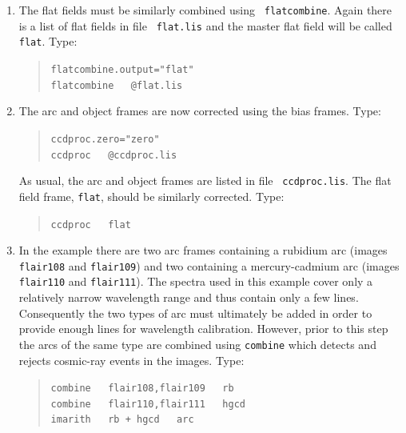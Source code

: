 \documentclass[twoside,11pt]{article}
\begin{document}
\begin{enumerate}
  \begin{quote}
   {\tt zerocombine.output="zero"  \\
   zerocombine ~ @zero.lis}
  \end{quote}

  \item The flat fields must be similarly combined using {\tt
   flatcombine}.  Again there is a list of flat fields in file {\tt
   flat.lis} and the master flat field will be called {\tt flat}.
   Type:

  \begin{quote}
   {\tt flatcombine.output="flat"  \\
   flatcombine ~ @flat.lis}
  \end{quote}

  \item The arc and object frames are now corrected using the bias
   frames.  Type:

  \begin{quote}
   {\tt ccdproc.zero="zero"  \\
   ccdproc ~ @ccdproc.lis}
  \end{quote}

   As usual, the arc and object frames are listed in file {\tt
   ccdproc.lis}.  The flat field frame, {\tt flat}, should be similarly
   corrected.  Type:

  \begin{quote}
   {\tt ccdproc ~ flat}
  \end{quote}

  \item In the example there are two arc frames containing a
   rubidium arc (images {\tt flair108} and {\tt flair109})
   and two containing a mercury-cadmium arc (images
   {\tt flair110} and {\tt flair111}).  The spectra used in this example
   cover only a relatively narrow wavelength range and thus contain
   only a few lines.  Consequently the two types of arc must
   ultimately be added in order to provide enough lines for
   wavelength calibration.  However, prior to this step the
   arcs of the same type are combined using {\tt combine}
   which detects and rejects cosmic-ray events in the images.
   Type:

  \begin{quote}
   {\tt combine ~ flair108,flair109 ~ rb \\
   combine ~ flair110,flair111 ~ hgcd    \\
   imarith ~ rb + hgcd ~ arc}
  \end{quote}


\end{enumerate}
\end{document}
